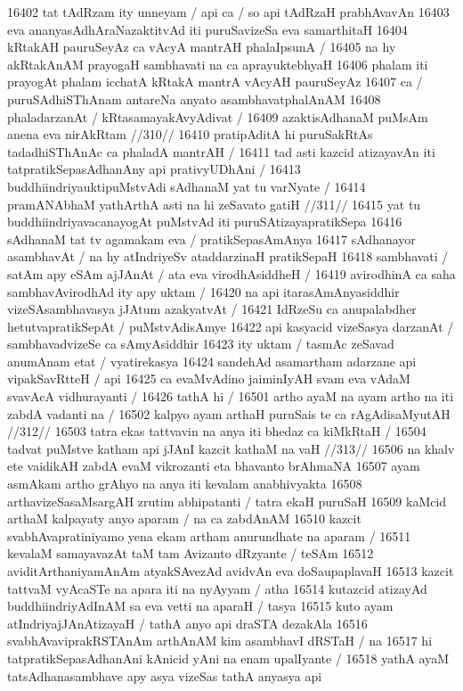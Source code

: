 16402 tat tAdRzam ity unneyam / api ca / so api tAdRzaH prabhAvavAn
16403 eva ananyasAdhAraNazaktitvAd iti puruSavizeSa eva samarthitaH 
16404 	kRtakAH pauruSeyAz ca vAcyA mantrAH phalaIpsunA / 
16405 na hy akRtakAnAM prayogaH sambhavati na ca aprayuktebhyaH
16406 phalam iti prayogAt phalam icchatA kRtakA mantrA vAcyAH pauruSeyAz 
16407 ca / puruSAdhiSThAnam antareNa anyato asambhavatphalAnAM
16408 phaladarzanAt / kRtasamayakAvyAdivat /
16409 	azaktisAdhanaM puMsAm anena eva nirAkRtam //310// 
16410 pratipAditA hi puruSakRtAs tadadhiSThAnAc ca phaladA mantrAH /
16411 tad asti kazcid atizayavAn iti tatpratikSepasAdhanAny api prativyUDhAni /
16413 	buddhiindriyauktipuMstvAdi sAdhanaM yat tu varNyate /
16414 	pramANAbhaM yathArthA asti na hi zeSavato gatiH //311//  
16415 yat tu buddhiindriyavacanayogAt puMstvAd iti puruSAtizayapratikSepa
16416 sAdhanaM tat tv agamakam eva / pratikSepasAmAnya
16417 sAdhanayor asambhavAt / na hy atIndriyeSv ataddarzinaH pratikSepaH 
16418 sambhavati / satAm apy eSAm ajJAnAt / ata eva virodhAsiddheH /
16419 avirodhinA ca saha sambhavAvirodhAd ity apy uktam / 
16420 na api itarasAmAnyasiddhir vizeSAsambhavasya jJAtum azakyatvAt /  
16421 IdRzeSu ca anupalabdher hetutvapratikSepAt / puMstvAdisAmye 
16422 api kasyacid vizeSasya darzanAt / sambhavadvizeSe ca  sAmyAsiddhir
16423 ity uktam / tasmAc zeSavad anumAnam etat / vyatirekasya  
16424 sandehAd asamartham adarzane api vipakSavRtteH / api  
16425 ca evaMvAdino jaiminIyAH svam eva vAdaM svavAcA vidhurayanti /  
16426 tathA hi /
16501 	artho ayaM na ayam artho na iti zabdA vadanti na /
16502 	kalpyo ayam arthaH puruSais te ca rAgAdisaMyutAH //312// 
16503 	tatra ekas tattvavin na anya iti bhedaz ca kiMkRtaH /
16504 	tadvat puMstve katham api jJAnI kazcit kathaM na vaH //313// 
16506 na khalv ete vaidikAH zabdA evaM vikrozanti eta bhavanto brAhmaNA  
16507 ayam asmAkam artho grAhyo na anya iti kevalam anabhivyakta 
16508 arthavizeSasaMsargAH zrutim abhipatanti / tatra ekaH puruSaH  
16509 kaMcid arthaM kalpayaty anyo aparam / na ca zabdAnAM  
16510 kazcit svabhAvapratiniyamo yena ekam artham anurundhate na aparam /  
16511 kevalaM samayavazAt taM tam Avizanto dRzyante / teSAm  
16512 aviditArthaniyamAnAm atyakSAvezAd avidvAn eva doSaupaplavaH  
16513 kazcit tattvaM vyAcaSTe na apara iti na nyAyyam / atha
16514 kutazcid atizayAd buddhiindriyAdInAM sa eva vetti na aparaH / tasya
16515 kuto ayam atIndriyajJAnAtizayaH / tathA anyo api draSTA dezakAla
16516 svabhAvaviprakRSTAnAm arthAnAM kim asambhavI dRSTaH / na  
16517 hi tatpratikSepasAdhanAni kAnicid yAni na enam upalIyante /  
16518 yathA ayaM tatsAdhanasambhave apy asya vizeSas tathA anyasya api  

